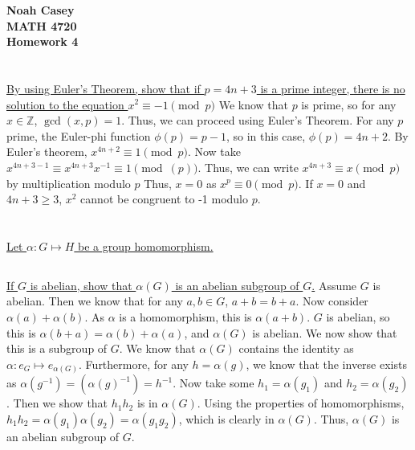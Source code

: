 \documentclass[10pt,a4paper]{report}
\begin{document}
\begin{center}
\textbf{Noah Casey}\\
\textbf{MATH 4720}\\
\textbf{Homework 4}
\end{center}

\section{}
\underline{By using Euler’s Theorem, show that if $p = 4n + 3$ is a prime integer, }\newline
\underline{there is no solution to the
equation $x^{2} \equiv -1\pmod{p}$}\newline
\indent We know that $p$ is prime, so for any $x\in\mathbb{Z}$, $\gcd(x,p)=1$. Thus, we can proceed using Euler's Theorem. For any $p$ prime, the Euler-phi function $\phi(p)=p-1$, so in this case, $\phi(p)=4n+2$. By Euler's theorem, $x^{4n+2}\equiv 1\pmod{p}$. Now take $x^{4n+3-1}\equiv x^{4n+3}x^{-1}\equiv 1\pmod(p)$. Thus, we can write $x^{4n+3}\equiv x \pmod{p}$ by multiplication modulo $p$ Thus, $x=0$ as $x^{p}\equiv 0 \pmod{p}$. If $x=0$ and $4n+3\geq 3$, $x^{2}$ cannot be congruent to -1 modulo $p$.

\section{}
\underline{Let $\alpha : G \mapsto H$ be a group homomorphism.}\newline

    \subsection{}
    \underline{If $G$ is abelian, show that $\alpha(G)$ is an abelian subgroup of $G$.}\newline
    \indent  Assume $G$ is abelian. Then we know that for any $a,b\in G$, $a+b=b+a$. Now consider $\alpha(a)+\alpha(b)$. 	As $\alpha$ is a homomorphism, this is $\alpha(a+b)$. $G$ is abelian, so this is $\alpha(b+a)=\alpha(b)+\alpha(a)$, 
    and $\alpha(G)$ is abelian. We now show that this is a subgroup of $G$. We know that $\alpha(G)$ contains the identity as $\alpha:e_{G}\mapsto e_{\alpha(G)}$. Furthermore, for any $h=\alpha(g)$, we know that the inverse exists as $\alpha(g^{-1})=(\alpha(g)^{-1})=h^{-1}$. Now take some $h_{1}=\alpha(g_{1})$ and $h_{2}=\alpha(g_{2})$. Then we show that $h_{1}h_{2}$ is in $\alpha(G)$. Using the properties of homomorphisms, $h_{1}h_{2}=\alpha(g_{1})\alpha(g_{2})=\alpha(g_{1}g_{2})$, which is clearly in $\alpha(G)$. Thus, $\alpha(G)$ is an abelian subgroup of $G$.
\end{document}
